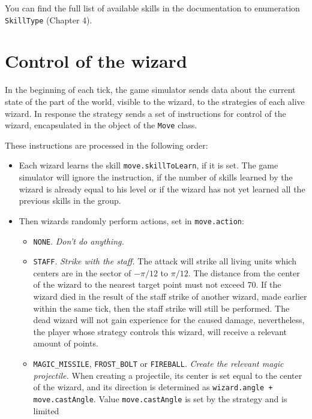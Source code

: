 You can find the full list of available skills in the documentation to enumeration \texttt{SkillType} (Chapter 4).
 
\section{Control of the wizard}
 
In the beginning of each tick, the game simulator sends data about the current state of the part of the world, visible to the wizard,
to the strategies of each alive wizard. In response the strategy sends a set of instructions for control of the wizard, encapsulated in the object of the \texttt{Move} class.
 
These instructions are processed in the following order:
\begin{itemize}
            \item Each wizard learns the skill \texttt{move.skillToLearn}, if it is set. The game simulator will ignore the instruction,
            if the number of skills learned by the wizard is already equal to his level or if the wizard has not yet learned all the previous skills in the group.
            \item Then wizards randomly perform actions, set in \texttt{move.action}:
            \begin{itemize}
            \item \texttt{NONE}. \textit{Don't do anything.}
            \item \texttt{STAFF}. \textit{Strike with the staff.} The attack will strike all living units which centers are in the sector of $-\pi / 12$ to $\pi / 12$.
                    The distance from the center of the wizard to the nearest target point must not exceed $70$. If the wizard died in the result
                    of the staff strike of another wizard, made earlier within the same tick, then the staff strike will still be performed. The dead
                    wizard will not gain experience for the caused damage, nevertheless, the player whose strategy controls this wizard, will receive
                    a relevant amount of points.
            \item \texttt{MAGIC\_MISSILE}, \texttt{FROST\_BOLT} or \texttt{FIREBALL}. \textit{Create the relevant magic projectile.}
                    When creating a projectile, its center is set equal to the center of the wizard, and its direction is determined as
                    \texttt{wizard.angle + move.castAngle}. Value \texttt{move.castAngle} is set by the strategy and is limited

\end{itemize}
\end{itemize}
